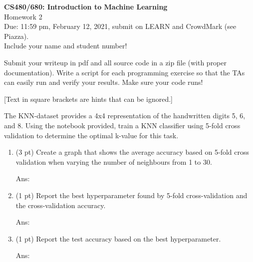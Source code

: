\documentclass[10pt,letter,notitlepage]{article}
\newcommand{\red}[1]{{\color{red}#1}}
\newcommand{\ans}[1]{{\color{orange}\textsf{Ans}: #1}}
\newcounter{exercise}
\begin{document}
\begin{center}
\large{\textbf{CS480/680: Introduction to Machine Learning} \\ Homework 2\\ \red{Due: 11:59 pm, February 12, 2021}, \red{submit on LEARN and CrowdMark (see Piazza)}.} \\

Include your name and student number!

\end{center}

\begin{center}
Submit your writeup in pdf and all source code in a zip file (with proper documentation). Write a script for each programming exercise so that the TAs can easily run and verify your results. Make sure your code runs!

[Text in square brackets are hints that can be ignored.]
\end{center}



\begin{exercise}
The KNN-dataset provides a 4x4 representation of the handwritten digits 5, 6, and 8. Using the notebook provided, train a KNN classifier using 5-fold cross validation to determine the optimal k-value for this task.

\begin{enumerate}
\item (3 pt) Create a graph that shows the average accuracy based on 5-fold cross validation when varying the number of neighbours from 1 to 30.

\ans{}

\item (1 pt) Report the best hyperparameter found by 5-fold cross-validation and the cross-validation accuracy.

\ans{} 

\item (1 pt) Report the test accuracy based on the best hyperparameter.

\ans{} 
\end{enumerate}
\end{exercise}
\end{document}
